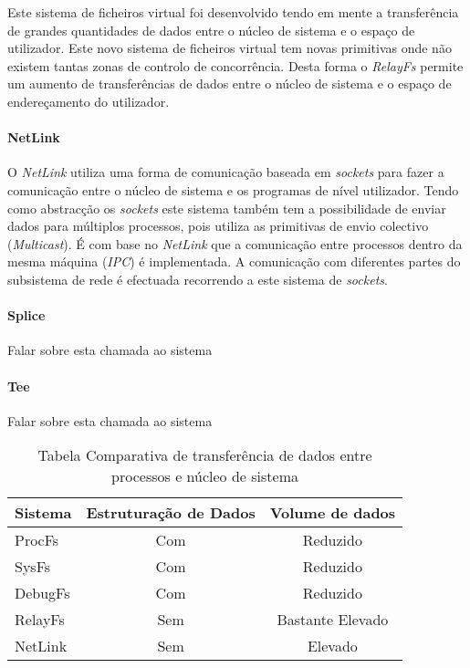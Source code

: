 Este sistema de ficheiros virtual foi desenvolvido tendo em mente a transferência de grandes quantidades de dados entre o núcleo de sistema e o espaço de utilizador.
 Este novo sistema de ficheiros virtual tem novas primitivas onde não existem tantas zonas de controlo de concorrência.
 Desta forma o \textit{RelayFs} permite um aumento de transferências de dados entre o núcleo de sistema e o espaço de endereçamento do utilizador\cite{Donovan2007}.

\paragraph*{NetLink}\label{cap:NetLink_overview}
O \textit{NetLink} utiliza uma forma de comunicação baseada em \textit{sockets} para fazer a comunicação entre o núcleo de sistema e os programas de nível utilizador. 
 Tendo como abstracção os \textit{sockets} este sistema também tem a possibilidade de enviar dados para múltiplos processos, pois utiliza as primitivas de envio colectivo (\textit{Multicast}).
 É com base no \textit{NetLink} que a comunicação entre processos dentro da mesma máquina (\textit{IPC}) é implementada.
 A comunicação com diferentes partes do subsistema de rede é efectuada recorrendo a este sistema de \textit{sockets}.

\paragraph*{Splice}
Falar sobre esta chamada ao sistema

\paragraph*{Tee}
Falar sobre esta chamada ao sistema


\begin{table}[h]
\begin{center}

\begin{tabular}{|l||c|c|}
\hline
Sistema & Estruturação de Dados & Volume de dados \\
\hline
ProcFs & Com & Reduzido \\
\hline
SysFs & Com & Reduzido \\
\hline
DebugFs & Com & Reduzido \\
\hline
RelayFs & Sem & Bastante Elevado \\
\hline
NetLink & Sem & Elevado \\
\hline
\end{tabular}
\caption{Tabela Comparativa de transferência de dados entre processos e núcleo de sistema}
\label{tab:transf_compare}
\end{center}
\end{table}

